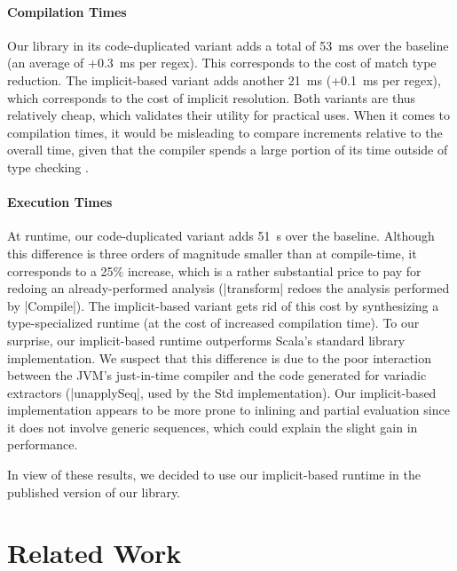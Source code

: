 \paragraph{Compilation Times} Our library in its code-duplicated variant adds a total of 53~ms over the baseline (an average of +0.3~ms per regex).
This corresponds to the cost of match type reduction.
The implicit-based variant adds another 21~ms (+0.1~ms per regex), which corresponds to the cost of implicit resolution.
Both variants are thus relatively cheap, which validates their utility for practical uses.
When it comes to compilation times, it would be misleading to compare increments relative to the overall time, given that the compiler spends a large portion of its time outside of type checking \citep[§ 2.11.3]{petrashko2017design}.

\paragraph{Execution Times} At runtime, our code-duplicated variant adds 51~\textmu s over the baseline.
Although this difference is three orders of magnitude smaller than at compile-time, it corresponds to a 25\% increase, which is a rather substantial price to pay for redoing an already-performed analysis (|transform| redoes the analysis performed by |Compile|).
The implicit-based variant gets rid of this cost by synthesizing a type-specialized runtime (at the cost of increased compilation time).
To our surprise, our implicit-based runtime outperforms Scala's standard library implementation.
We suspect that this difference is due to the poor interaction between the JVM's just-in-time compiler and the code generated for variadic extractors (|unapplySeq|, used by the Std implementation).
Our implicit-based implementation appears to be more prone to inlining and partial evaluation since it does not involve generic sequences, which could explain the slight gain in performance.

\bigskip

In view of these results, we decided to use our implicit-based runtime in the published version of our library.

\section{Related Work}
\label{sec:related}

